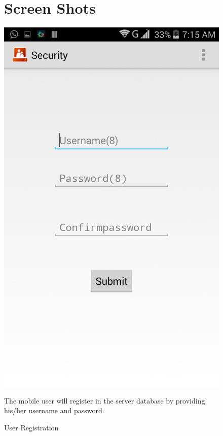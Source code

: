 
\begin{figure}
\label{Appendix}
\section{Screen Shots}
\begin{center}
\scalebox{0.25}
{\includegraphics{reg.png}}
\caption{User Registration}  
\end{center}
The mobile user will register in the server database by providing his/her username and password.
\end{figure}

